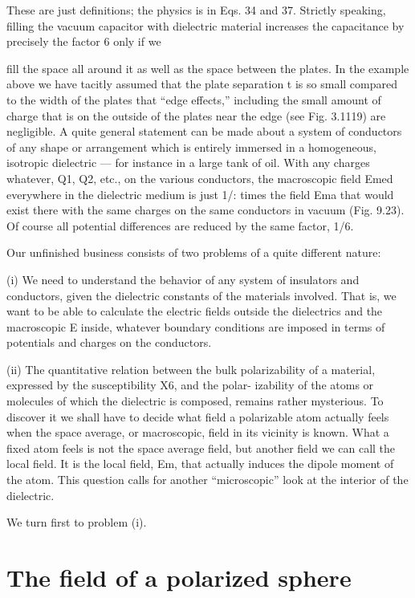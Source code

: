 {These are just definitions; the physics is in Eqs. 34 and 37.
Strictly speaking, filling the vacuum capacitor with dielectric material
increases the capacitance by precisely the factor 6 only if we

fill the space all around it as well as the space between the plates.
In the example above we have tacitly assumed that the plate separation
t is so small compared to the width of the plates that ``edge
effects,'' including the small amount of charge that is on the outside
of the plates near the edge (see Fig. 3.1119) are negligible. A quite
general statement can be made about a system of conductors of any
shape or arrangement which is entirely immersed in a homogeneous,
isotropic dielectric --- for instance in a large tank of oil. With any
charges whatever, Q1, Q2, etc., on the various conductors, the macroscopic
field Emed everywhere in the dielectric medium is just 1/: times
the field Ema that would exist there with the same charges on the
same conductors in vacuum (Fig. 9.23). Of course all potential
differences are reduced by the same factor, 1/6.

Our unfinished business consists of two problems of a quite different
nature:

(i) We need to understand the behavior of any system of insulators
and conductors, given the dielectric constants of the
materials involved. That is, we want to be able to calculate
the electric fields outside the dielectrics and the macroscopic
E inside, whatever boundary conditions are imposed
in terms of potentials and charges on the conductors.

(ii) The quantitative relation between the bulk polarizability of
a material, expressed by the susceptibility X6, and the polar-
izability of the atoms or molecules of which the dielectric
is composed, remains rather mysterious. To discover it
we shall have to decide what field a polarizable atom
actually feels when the space average, or macroscopic, field
in its vicinity is known. What a fixed atom feels is not the
space average field, but another field we can call the local
field. It is the local field, Em, that actually induces the
dipole moment of the atom. This question calls for another
``microscopic'' look at the interior of the dielectric.

We turn first to problem (i).

\section{The field of a polarized sphere}

}

